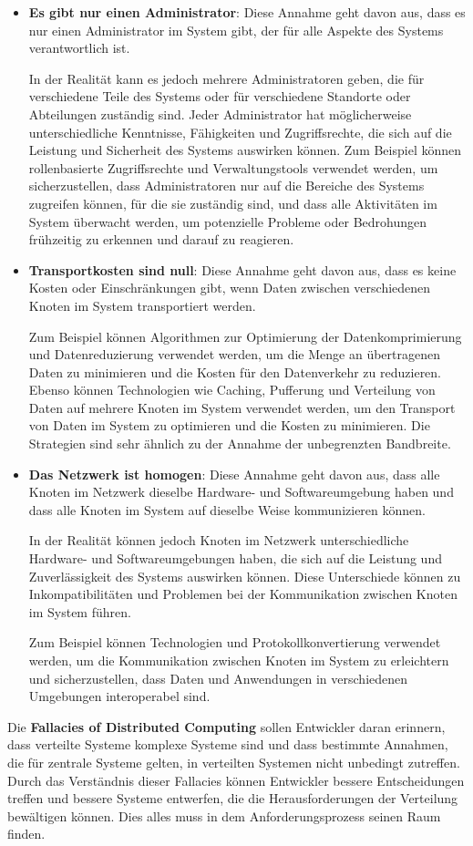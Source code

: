 \documentclass[../vs-script-first-v01.tex]{subfiles}
\begin{document}
\begin{itemize}
  \item \textbf{Es gibt nur einen Administrator}: Diese Annahme geht davon aus, dass es nur einen Administrator im System gibt, der für alle Aspekte des Systems verantwortlich ist.

        In der Realität kann es jedoch mehrere Administratoren geben, die für verschiedene Teile des Systems oder für verschiedene Standorte oder Abteilungen zuständig sind. Jeder Administrator hat möglicherweise unterschiedliche Kenntnisse, Fähigkeiten und Zugriffsrechte, die sich auf die Leistung und Sicherheit des Systems auswirken können.
        Zum Beispiel können rollenbasierte Zugriffsrechte und Verwaltungstools verwendet werden, um sicherzustellen, dass Administratoren nur auf die Bereiche des Systems zugreifen können, für die sie zuständig sind, und dass alle Aktivitäten im System überwacht werden, um potenzielle Probleme oder Bedrohungen frühzeitig zu erkennen und darauf zu reagieren.

  \item \textbf{Transportkosten sind null}:
        Diese Annahme geht davon aus, dass es keine Kosten oder Einschränkungen gibt, wenn Daten zwischen verschiedenen Knoten im System transportiert werden.

        Zum Beispiel können Algorithmen zur Optimierung der Datenkomprimierung und Datenreduzierung verwendet werden, um die Menge an übertragenen Daten zu minimieren und die Kosten für den Datenverkehr zu reduzieren. Ebenso können Technologien wie Caching, Pufferung und Verteilung von Daten auf mehrere Knoten im System verwendet werden, um den Transport von Daten im System zu optimieren und die Kosten zu minimieren. Die Strategien sind sehr ähnlich zu der Annahme der unbegrenzten Bandbreite.
  \item \textbf{Das Netzwerk ist homogen}: Diese Annahme geht davon aus, dass alle Knoten im Netzwerk dieselbe Hardware- und Softwareumgebung haben und dass alle Knoten im System auf dieselbe Weise kommunizieren können.

        In der Realität können jedoch Knoten im Netzwerk unterschiedliche Hardware- und Softwareumgebungen haben, die sich auf die Leistung und Zuverlässigkeit des Systems auswirken können. Diese Unterschiede können zu Inkompatibilitäten und Problemen bei der Kommunikation zwischen Knoten im System führen.

        Zum Beispiel können Technologien und Protokollkonvertierung verwendet werden, um die Kommunikation zwischen Knoten im System zu erleichtern und sicherzustellen, dass Daten und Anwendungen in verschiedenen Umgebungen interoperabel sind.
\end{itemize}
Die \textbf{Fallacies of Distributed Computing} sollen Entwickler daran erinnern, dass verteilte Systeme komplexe Systeme sind und dass bestimmte Annahmen, die für zentrale Systeme gelten, in verteilten Systemen nicht unbedingt zutreffen. Durch das Verständnis dieser Fallacies können Entwickler bessere Entscheidungen treffen und bessere Systeme entwerfen, die die Herausforderungen der Verteilung bewältigen können. Dies alles muss in dem Anforderungsprozess seinen Raum finden.

\label{Woche02}
\end{document}
